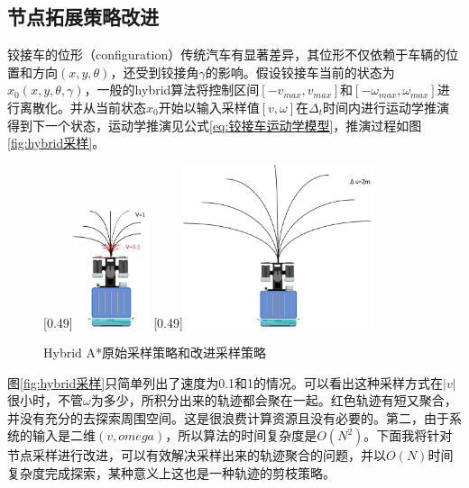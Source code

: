 \documentclass[master,academic]{ysuthesis} %
\begin{document}
		\subsection{节点拓展策略改进}
		铰接车的位形（configuration）传统汽车有显著差异，其位形不仅依赖于车辆的位置和方向$(x,y,\theta)$，还受到铰接角$\gamma$的影响。假设铰接车当前的状态为$x_0(x,y,\theta,\gamma)$，一般的hybrid算法将控制区间$[-v_{max},v_{max}]$和$[-\omega_{max},\omega_{max}]$进行离散化。并从当前状态$x_0$开始以输入采样值$[v,\omega]$在$\Delta_t$时间内进行运动学推演得到下一个状态，运动学推演见公式\ref{eq:铰接车运动学模型}，推演过程如图\ref{fig:hybrid采样}。
		\begin{figure}[!ht]
			\centering
			[0.49\textwidth]{\includegraphics[width=0.2\textwidth]{hybrid采样.png}}
			[0.49\textwidth]{\includegraphics[width=0.5\textwidth]{hybrid采样改进剪枝.png}}
			\caption{Hybrid A*原始采样策略和改进采样策略}
			\label{fig:Hybrid A*原始采样策略和改进采样策略}
		\end{figure}
		图\ref{fig:hybrid采样}只简单列出了速度为0.1和1的情况。可以看出这种采样方式在$|v|$很小时，不管$\omega$为多少，所积分出来的轨迹都会聚在一起。红色轨迹有短又聚合，并没有充分的去探索周围空间。这是很浪费计算资源且没有必要的。第二，由于系统的输入是二维$(v,omega)$，所以算法的时间复杂度是$O(N^2)$。下面我将针对节点采样进行改进，可以有效解决采样出来的轨迹聚合的问题，并以$O(N)$时间复杂度完成探索，某种意义上这也是一种轨迹的剪枝策略。 
\end{document}
